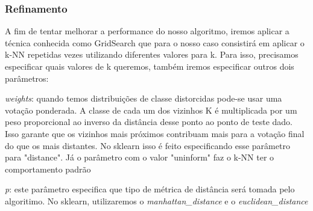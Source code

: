 \documentclass[11pt]{article}
\begin{document}
\subsubsection{Refinamento}\label{refinamento}

A fim de tentar melhorar a performance do nosso algoritmo, iremos
aplicar a técnica conhecida como GridSearch que para o nosso caso
consistirá em aplicar o k-NN repetidas vezes utilizando diferentes
valores para k. Para isso, precisamos especificar quais valores de k
queremos, também iremos especificar outros dois parâmetros:

\emph{weights}: quando temos distribuições de classe distorcidas pode-se
usar uma votação ponderada. A classe de cada um dos vizinhos K é
multiplicada por um peso proporcional ao inverso da distância desse
ponto ao ponto de teste dado. Isso garante que os vizinhos mais próximos
contribuam mais para a votação final do que os mais distantes. No
sklearn isso é feito especificando esse parâmetro para "distance". Já o
parâmetro com o valor "uninform" faz o k-NN ter o comportamento padrão

\emph{p}: este parâmetro especifica que tipo de métrica de distância
será tomada pelo algoritimo. No sklearn, utilizaremos o
\emph{manhattan\_distance} e o \emph{euclidean\_distance}
\end{document}
